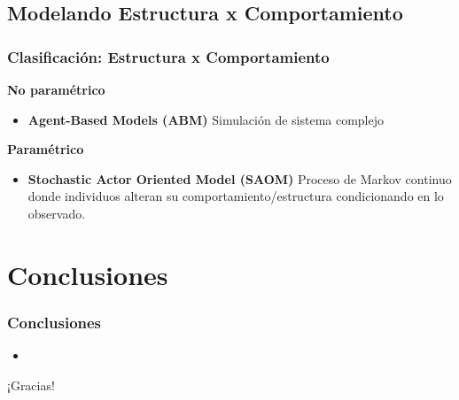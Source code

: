 \documentclass[handout]{beamer}
\begin{document}
\subsection{Modelando Estructura x Comportamiento}

\begin{frame}
	\frametitle{Clasificación: Estructura x Comportamiento}
	
	\textbf{No paramétrico}
	\begin{itemize}
		\item \textbf{Agent-Based Models (ABM)} Simulación de sistema complejo
	\end{itemize}

	\textbf{Paramétrico}
	\begin{itemize}
		\item \textbf{Stochastic Actor Oriented Model (SAOM)} Proceso de Markov continuo donde individuos alteran su comportamiento/estructura condicionando en lo observado.
	\end{itemize}


\end{frame}

\section{Conclusiones}

\begin{frame}
	\frametitle{Conclusiones}
	\begin{itemize}
		\item 
	\end{itemize}
\end{frame}

\begin{frame}
	\centering
	\Huge ¡Gracias! \normalsize 
\titlepage
\end{frame}
\end{document}
